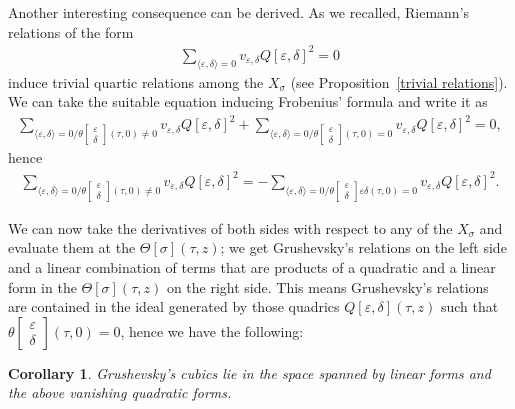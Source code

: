\documentclass[pdftex]{sigma}
\numberwithin{equation}{section}
\newtheorem{Corollary}[Theorem]{Corollary}
\newcommand{\de}{\delta}
\newcommand{\ep}{\varepsilon}
\def\s{\sigma}
\def\T{\Theta}
\begin{document}
Another interesting consequence can be derived. As we recalled, Riemann's relations of the form
\begin{gather*}%
\sum_{\langle\ep,\de\rangle =0} v_{\ep,\de} Q[\ep, \de]^2 =0
\end{gather*}
induce trivial quartic relations among the $X_{\s}$ (see Proposition~\ref{trivial relations}). We can take the suitable equation inducing Frobenius' formula and write it as
\begin{gather*}%
\sum_{\langle\ep,\de\rangle =0/ \theta\left[\begin{smallmatrix}\ep \\ \de\end{smallmatrix}\right](\tau,0)\neq 0 } v_{\ep,\de}Q[\ep, \de]^2 +
 \sum_{\langle\ep,\de\rangle =0/ \theta\left[\begin{smallmatrix}\ep \\ \de\end{smallmatrix}\right](\tau,0)=0 } v_{\ep,\de}Q[\ep, \de]^2 =0,
\end{gather*}
hence
\begin{gather*}%
\sum_{\langle\ep,\de\rangle =0/ \theta\left[\begin{smallmatrix}\ep \\ \de\end{smallmatrix}\right](\tau,0)\neq 0 } v_{\ep,\de}Q[\ep, \de]^2 =
 -\sum_{\langle\ep,\de\rangle =0/ \theta\left[\begin{smallmatrix}\ep \\ \de\end{smallmatrix}\right]\ep\de(\tau,0)=0 } v_{\ep,\de}Q[\ep, \de]^2.
\end{gather*}

We can now take the derivatives of both sides with respect to any of the $X_{\s}$ and evaluate them at the $\T[\s](\tau,z)$; we get Grushevsky's relations on the left side and a linear combination of terms that are products of a quadratic and a linear form in the $\T[\s](\tau,z)$ on the right side. This means Grushevsky's relations are contained in the ideal generated by those quadrics
 $Q[\ep, \de] (\tau, z)$ such that $\theta\left[\begin{smallmatrix}\ep \\ \de\end{smallmatrix}\right](\tau,0)=0$, hence we have the following:

\begin{Corollary} Grushevsky's cubics lie in the space spanned by linear forms and the above vanishing quadratic forms.
 \end{Corollary}
\end{document}
